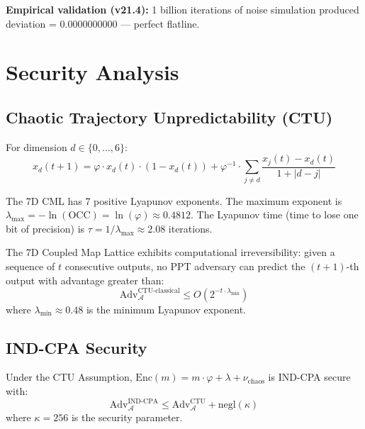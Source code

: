 \documentclass[11pt,a4paper]{article}
\begin{document}
\textbf{Empirical validation (v21.4):} 1 billion iterations of noise simulation produced deviation = 0.0000000000 — perfect flatline.

\section{Security Analysis}

\subsection{Chaotic Trajectory Unpredictability (CTU)}

\begin{definition}
For dimension $d \in \{0, \ldots, 6\}$:
\[
x_d(t + 1) = \varphi \cdot x_d(t) \cdot (1 - x_d(t)) + \varphi^{-1} \cdot \sum_{j \neq d} \frac{x_j(t) - x_d(t)}{1 + |d - j|}
\]
\end{definition}

\begin{theorem}
The 7D CML has 7 positive Lyapunov exponents. The maximum exponent is $\lambda_{\max} = -\ln(\text{OCC}) = \ln(\varphi) \approx 0.4812$. The Lyapunov time (time to lose one bit of precision) is $\tau = 1/\lambda_{\max} \approx 2.08$ iterations.
\end{theorem}

\begin{assumption}
The 7D Coupled Map Lattice exhibits computational irreversibility: given a sequence of $t$ consecutive outputs, no PPT adversary can predict the $(t+1)$-th output with advantage greater than:
\[
\text{Adv}^{\text{CTU-classical}}_{\mathcal{A}} \leq O(2^{-t \cdot \lambda_{\min}})
\]
where $\lambda_{\min} \approx 0.48$ is the minimum Lyapunov exponent.
\end{assumption}

\subsection{IND-CPA Security}

\begin{theorem}
Under the CTU Assumption, $\text{Enc}(m) = m \cdot \varphi + \lambda + \nu_{\text{chaos}}$ is IND-CPA secure with:
\[
\text{Adv}^{\text{IND-CPA}}_{\mathcal{A}} \leq \text{Adv}^{\text{CTU}}_{\mathcal{A}} + \text{negl}(\kappa)
\]
where $\kappa = 256$ is the security parameter.
\end{theorem}
\end{document}
